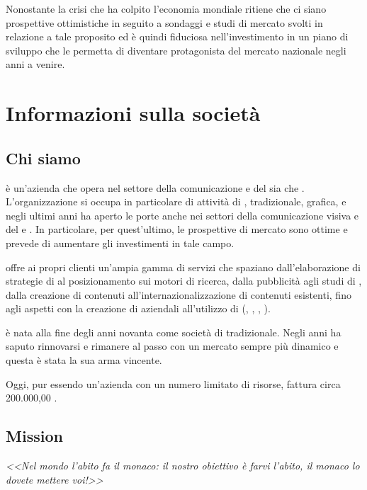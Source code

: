 Nonostante la crisi che ha colpito l'economia mondiale \customer ritiene che ci siano prospettive ottimistiche in seguito a sondaggi e studi di mercato svolti in relazione a tale proposito ed è quindi fiduciosa nell'investimento in un piano di sviluppo che le permetta di diventare protagonista del mercato nazionale negli anni a venire.



\chapter{Informazioni sulla società}\label{sec:whoweare}

\section{Chi siamo}
\customer è un'azienda che opera nel settore della comunicazione e del \mktg sia  che . 
L'organizzazione si occupa in particolare di attività di , \mktg tradizionale, grafica, e negli ultimi anni ha aperto le porte anche nei settori della comunicazione visiva e del \mktg {} e . In particolare, per quest'ultimo, le prospettive di mercato sono ottime e \customer prevede di aumentare gli investimenti in tale campo.

\customer offre ai propri clienti un'ampia gamma di servizi che spaziano dall'elaborazione di strategie di \mktg al posizionamento sui motori di ricerca, dalla pubblicità  agli studi di , dalla creazione di contenuti all'internazionalizzazione di contenuti esistenti, fino agli aspetti  con la creazione di  aziendali all'utilizzo di  (, , , ).

\customer è nata alla fine degli anni novanta come società di  tradizionale. Negli anni ha saputo rinnovarsi e rimanere al passo con un mercato sempre più dinamico e questa è stata la sua arma vincente.

Oggi, pur essendo un'azienda con un numero limitato di risorse, fattura circa  200.000,00 \text{\euro}.

\section{Mission}
\begin{Large}
\itshape
<<Nel mondo l'abito fa il monaco: il nostro obiettivo è farvi l'abito, il monaco lo dovete mettere voi!>>
\end{Large}


